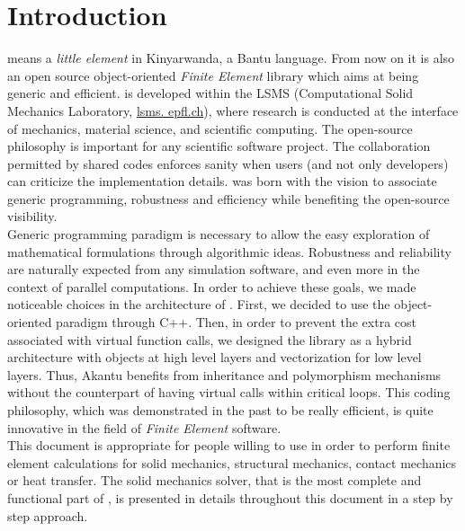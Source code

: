 \chapter{Introduction}

\akantu means a \textit{little element} in Kinyarwanda, a
Bantu language. From now on it is also an open source
object-oriented \textit{Finite Element} library which aims at being generic and efficient.
\akantu is developed within the LSMS (Computational Solid Mechanics Laboratory, \url{lsms.
epfl.ch}), where research is conducted at the interface of mechanics, material
science, and scientific computing.
The open-source philosophy is important for any
scientific software project. The collaboration
permitted by shared codes enforces sanity when users (and not
only developers) can criticize the implementation details.
\akantu was born with the vision to associate generic programming, robustness
and efficiency while benefiting the open-source visibility.\\

Generic programming paradigm is necessary to allow the easy exploration of mathematical
formulations through algorithmic ideas. Robustness and reliability are naturally
expected from any simulation software, and even more in the context of parallel
computations.  In order to achieve these goals, we made noticeable choices in
the architecture of \akantu. First, we decided to use the object-oriented
paradigm through C++. Then, in order to prevent the extra cost associated with
virtual function calls, we designed the library as a hybrid architecture with
objects at high level layers and vectorization for low level layers. Thus,
Akantu benefits from inheritance and polymorphism mechanisms without the
counterpart of having virtual calls within critical loops.  This coding
philosophy, which was demonstrated in the past to be really
efficient, is quite innovative in the field of \textit{Finite Element} software. \\

This document is appropriate for people willing to use \akantu in order to
perform finite element calculations for solid mechanics, structural mechanics,
contact mechanics or heat transfer. The solid mechanics solver, that is the most
complete and functional part of \akantu, is presented in details throughout this
document in a step by step approach.

